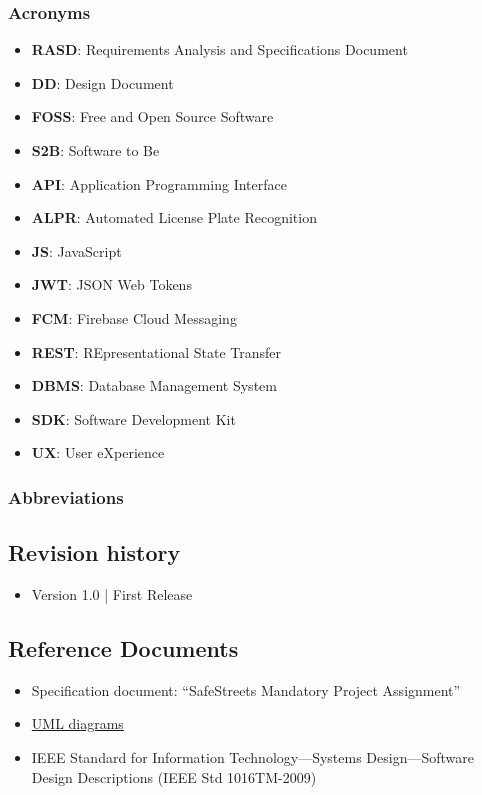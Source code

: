 \documentclass{article}
\begin{document}
\subsubsection{Acronyms}
\begin{itemize}
	\item \textbf{RASD}: Requirements Analysis and Specifications Document  
	\item \textbf{DD}: Design Document
	\item \textbf{FOSS}: Free and Open Source Software
	\item \textbf{S2B}: Software to Be
	\item \textbf{API}: Application Programming Interface
	\item \textbf{ALPR}: Automated License Plate Recognition
	\item \textbf{JS}: JavaScript
	\item \textbf{JWT}: JSON Web Tokens
	\item \textbf{FCM}: Firebase Cloud Messaging
	\item \textbf{REST}: REpresentational State Transfer
	\item \textbf{DBMS}: Database Management System
	\item \textbf{SDK}: Software Development Kit
	\item \textbf{UX}: User eXperience
\end{itemize}

\subsubsection{Abbreviations}

\subsection{Revision history}
\begin{itemize}
	\item Version 1.0 | First Release
\end{itemize}

\subsection{Reference Documents}
\begin{itemize}
	\item Specification document: “SafeStreets Mandatory Project Assignment” 	
	\item \href{https://www.uml-diagrams.org}{UML diagrams}
	\item IEEE Standard for Information Technology—Systems Design—Software Design Descriptions (IEEE Std 1016TM-2009)
\end{itemize}
\end{document}

